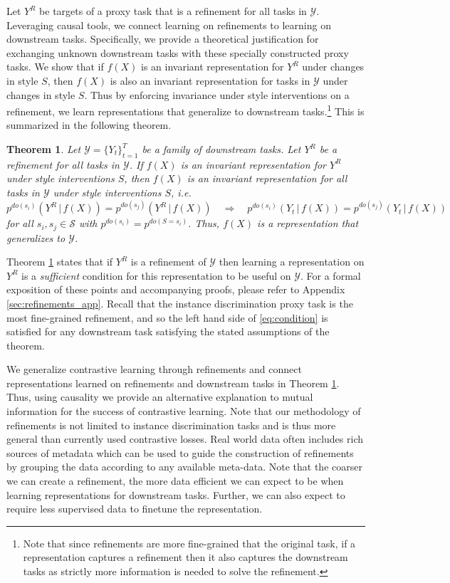 \documentclass{article}
\newcommand{\feat}{f}
\newtheorem{theorem}{Theorem}
\begin{document}
Let $Y^{R}$ be targets of a proxy task that is a refinement for all tasks in $\mathcal{Y}$.
Leveraging causal tools, we connect learning on refinements to learning on downstream tasks.
Specifically, we provide a theoretical justification for exchanging unknown downstream tasks with these specially constructed proxy tasks. 
We show that if $\feat(X)$ is an invariant representation for $Y^{R}$ under changes in style $S$, then $\feat(X)$ is also an invariant representation for tasks in $\mathcal{Y}$ under changes in style $S$.
Thus by enforcing invariance under style interventions on a refinement, we learn representations that generalize to downstream tasks.\footnote{Note that since refinements are more fine-grained that the original task, if a representation captures a refinement then it also captures the downstream tasks as strictly more information is needed to solve the refinement.}
This is summarized in the following theorem. 
\begin{theorem}
    Let $\mathcal{Y}=\{Y_t\}_{t=1}^{T}$ be a family of downstream tasks. Let $Y^{R}$ be a refinement for all tasks in $\mathcal{Y}$. 
    If $\feat(X)$ is an invariant representation for $Y^{R}$ under style interventions $S$, then $\feat(X)$ is an invariant representation for all tasks in $\mathcal{Y}$ under style interventions $S$, i.e.
    \begin{equation}
    \label{eq:condition}
    p^{do(s_{i})}(Y^{R}\,\vert\,\feat(X)) = p^{do(s_{j})}(Y^{R}\,\vert\,\feat(X)) \quad 
    \Rightarrow \quad 
    p^{do(s_{i})}(Y_{t}\,\vert\,\feat(X)) = p^{do(s_{j})}(Y_{t}\,\vert\,\feat(X))
    \end{equation}
for all $s_{i}, s_{j}\in\mathcal{S}$ with $p^{do(s_{i})}=p^{do(S = s_{i})}$. Thus, $\feat(X)$ is a representation that generalizes to $\mathcal{Y}$.
\label{thm.condition}
\end{theorem}

Theorem \ref{thm.condition} states that if $Y^{R}$ is a refinement of $\mathcal{Y}$ then learning a representation on $Y^{R}$ is a \emph{sufficient} condition for this representation to be useful on $\mathcal{Y}$. 
For a formal exposition of these points and accompanying proofs, please refer to Appendix \ref{sec:refinements_app}.
Recall that the instance discrimination proxy task is the most fine-grained refinement, and so the left hand side of \ref{eq:condition} is satisfied for any downstream task satisfying the stated assumptions of the theorem.

We generalize contrastive learning through refinements and connect representations learned on refinements and downstream tasks in Theorem \ref{thm.condition}. Thus, using causality we provide an alternative explanation to mutual information for the success of contrastive learning.
Note that our methodology of refinements is not limited to instance discrimination tasks and is thus more general than currently used contrastive losses. 
Real world data often includes rich sources of metadata which can be used to guide the construction of refinements
by grouping the data according to any available meta-data. 
Note that the coarser we can create a refinement, the more data efficient we can expect to be when learning representations for downstream tasks.
Further, we can also expect to require less supervised data to finetune the representation.
\end{document}
